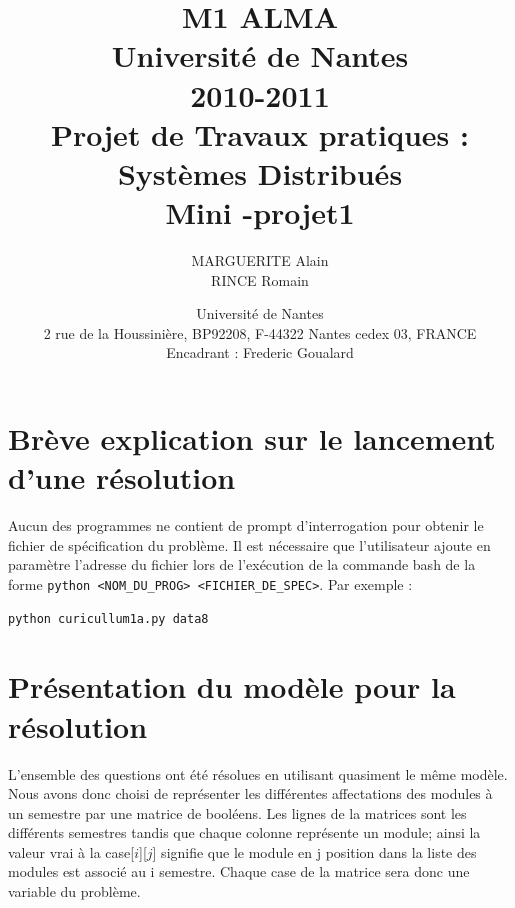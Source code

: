 \documentclass[a4paper]{article}
\title
{
	\normalsize{ M1 ALMA\\ 
	Université de Nantes\\
	2010-2011}\\
	\vspace{15mm}
	\Huge{Projet de Travaux pratiques :\\Systèmes Distribués \\ Mini -projet1}
}
\author{MARGUERITE Alain\\ RINCE Romain
	\vspace{45mm}
}
\date
{	
	\normalsize{Université de Nantes \\ 2 rue de la Houssinière, BP92208, F-44322 Nantes cedex 03, FRANCE
	\\ 
	\vspace{5mm}	
	Encadrant : Frederic Goualard \\
	}
}
\begin{document}
\maketitle
\clearpage
\section{Brève explication sur le lancement d'une résolution}
Aucun des programmes ne contient de prompt d'interrogation pour obtenir le fichier de spécification du problème. Il est nécessaire que l'utilisateur ajoute en paramètre l'adresse du fichier lors de l’exécution de la commande bash de la forme \verb+python <NOM_DU_PROG> <FICHIER_DE_SPEC>+. Par exemple : \begin{verbatim}python curicullum1a.py data8\end{verbatim}

\section{Présentation du modèle pour la résolution}
L'ensemble des questions ont été résolues en utilisant quasiment le même modèle. Nous avons donc choisi de représenter les différentes affectations des modules à un semestre par une matrice de booléens.  Les lignes de la matrices sont les différents semestres tandis que chaque colonne représente un module; ainsi la valeur vrai à la case[$i$][$j$] signifie que le module en j position dans la liste des modules est associé au i semestre. Chaque case de la matrice sera donc une variable du problème.
\end{document}

